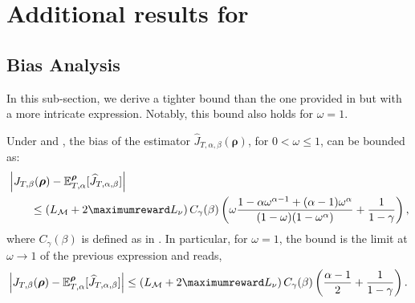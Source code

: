 \section{Additional results for \texorpdfstring{}{}}

\subsection{Bias Analysis}

In this sub-section, we derive a tighter bound than the one provided in  but with a more intricate expression. 
Notably, this bound also holds for $\omega=1$.

\begin{lemma}
\label{lem:bias_general}
Under  and , the bias of the estimator $\widehat{J}_{T,\alpha,\beta}(\boldsymbol\rho)$, for $0<\omega\leq1$, can be bounded as:
\begin{align*}
    &\left\vert J_{T,\beta}(\boldsymbol\rho) - \mathbb{E}^{\boldsymbol\rho}_{T,\alpha}[\widehat{J}_{T,\alpha,\beta}] \right\vert
    \\
    &\qquad \le\left(L_{\mathcal{M}} + 2\maximumreward L_\nu\right) C_{\gamma}(\beta) \left(\omega 
    \frac{1-\alpha\omega^{\alpha-1} + (\alpha-1) \omega^\alpha}{(1-\omega)(1-\omega^\alpha)} + \frac{1}{1-\gamma}\right),
\end{align*}
where $C_\gamma(\beta)$ is defined as in .
In particular, for $\omega=1$, the bound is the limit at $\omega \rightarrow 1$ of the previous expression and reads,
\begin{align*}
    \left|J_{T,\beta}(\boldsymbol\rho) - \mathbb{E}^{\boldsymbol\rho}_{T,\alpha}[\widehat{J}_{T,\alpha,\beta}] \right|\le \left(L_{\mathcal{M}} + 2\maximumreward L_\nu\right) C_{\gamma}(\beta) \left(\frac{\alpha-1}{2} + \frac{1}{1-\gamma}  \right).
\end{align*}
\end{lemma}
